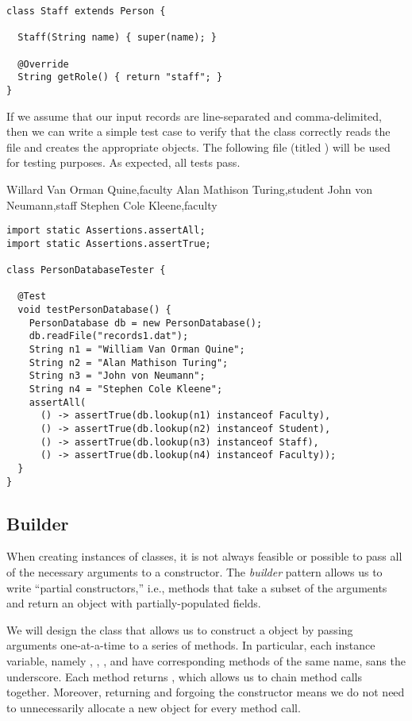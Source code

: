 \begin{lstlisting}[language=MyJava]
class Staff extends Person {

  Staff(String name) { super(name); }

  @Override
  String getRole() { return "staff"; }
}
\end{lstlisting}

If we assume that our input records are line-separated and comma-delimited, then we can write a simple test case to verify that the  class correctly reads the file and creates the appropriate  objects. 
The following file (titled ) will be used for testing purposes. 
As expected, all tests pass.

\begin{verbnobox}[\small]
Willard Van Orman Quine,faculty
Alan Mathison Turing,student
John von Neumann,staff
Stephen Cole Kleene,faculty
\end{verbnobox}

\begin{lstlisting}[language=MyJava]
import static Assertions.assertAll;
import static Assertions.assertTrue;

class PersonDatabaseTester {

  @Test
  void testPersonDatabase() {
    PersonDatabase db = new PersonDatabase();
    db.readFile("records1.dat");
    String n1 = "William Van Orman Quine";
    String n2 = "Alan Mathison Turing";
    String n3 = "John von Neumann";
    String n4 = "Stephen Cole Kleene";
    assertAll(
      () -> assertTrue(db.lookup(n1) instanceof Faculty),
      () -> assertTrue(db.lookup(n2) instanceof Student),
      () -> assertTrue(db.lookup(n3) instanceof Staff),
      () -> assertTrue(db.lookup(n4) instanceof Faculty));
  }
}
\end{lstlisting}


\subsection{Builder}

When creating instances of classes, it is not always feasible or possible to pass all of the necessary arguments to a constructor. 
The \emph{builder} pattern allows us to write ``partial constructors,'' i.e., methods that take a subset of the arguments and return an object with partially-populated fields.

We will design the  class that allows us to construct a  object by passing arguments one-at-a-time to a series of methods. 
In particular, each instance variable, namely , , , and  have corresponding methods of the same name, sans the underscore. 
Each method returns , which allows us to chain method calls together. 
Moreover, returning  and forgoing the constructor means we do not need to unnecessarily allocate a new  object for every method call.


